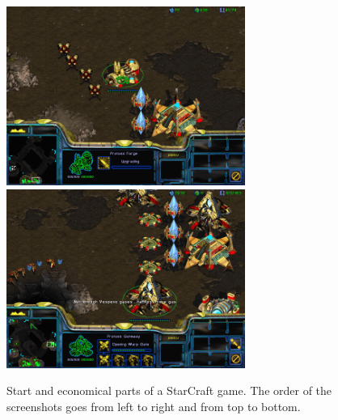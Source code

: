 \begin{figure}[!ht]
\begin{center}
\includegraphics[width=7.8cm]{images/SC_game/SC_upgrade_attack.png}
\includegraphics[width=7.8cm]{images/SC_game/SC_queue_production.png}
\label{fig:SC_game1}
\caption{Start and economical parts of a StarCraft game. The order of the screenshots goes from left to right and from top to bottom.}
\end{center}
\end{figure}

